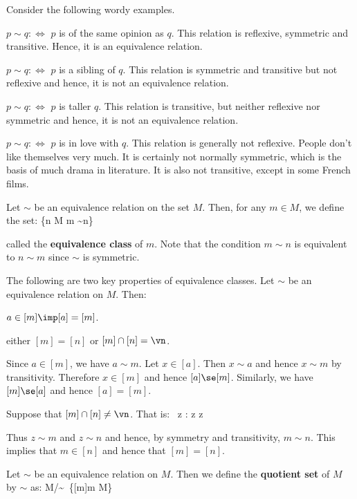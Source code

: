 \be
Consider the following wordy examples.
\ben[label=\alph*)]
\item $p\sim q :\Leftrightarrow $ $p$ is of the same opinion as $q$. This relation is reflexive, symmetric and
transitive. Hence, it is an equivalence relation.
\item $p\sim q :\Leftrightarrow $ $p$ is a sibling of $q$. This relation is symmetric and transitive but not reflexive
and hence, it is not an equivalence relation.
\item $p\sim q :\Leftrightarrow $ $p$ is taller $q$. This relation is transitive, but neither reflexive nor symmetric
and hence, it is not an equivalence relation.
\item $p\sim q :\Leftrightarrow $ $p$ is in love with $q$. This relation is generally not reflexive. People don't like
themselves very much. It is certainly not normally symmetric, which is the basis of much drama in literature. It is also
not transitive, except in some French films.
\een
\ee

Let $\sim$ be an equivalence relation on the set $M$. Then, for any $m \in M$, we define the set:
\bse
[m] \coloneqq \{n \in M \mid m \sim n\}
\ese

called the \textbf{equivalence class} of $m$. Note that the condition $m \sim n$ is equivalent to $n \sim m$ since
$\sim$ is symmetric.
\ed

The following are two key properties of equivalence classes.
\bt[]
Let $\sim$ be an equivalence relation on $M$. Then:
\ben
\item[i)] $a \in [m] \imp [a]=[m]$.
\item[ii)] either $[m]=[n]$ or $[m] \cap [n] = \vn$.
\een
\et

\bq
\ben
\item[i)] Since $a\in[m]$, we have $a\sim m$. Let $x \in [a]$. Then $x \sim a$ and hence $x \sim m$ by transitivity.
Therefore $x \in [m]$ and hence $[a]\se[m]$. Similarly, we have $[m]\se[a]$ and hence $[a]=[m]$.
\item[ii)] Suppose that $[m]\cap[n]\neq\vn$. That is:
\bse
\exists \, z : z \in [m] \land z \in [n]
\ese

Thus $z \sim m$ and $z \sim n$ and hence, by symmetry and transitivity, $m \sim n$. This implies that $m \in [n]$ and
hence that $[m] = [n]$. \qedhere
\een
\eq

Let $\sim$ be an equivalence relation on $M$. Then we define the \textbf{quotient set} of $M$ by $\sim$ as:
\bse
M/\!\sim\ \coloneqq \{[m]\mid m \in M\}
\ese

